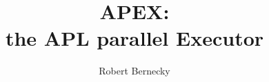 \documentclass[12pt,twoside]{utthesis}
\author{Robert Bernecky}
\title{APEX:\\ the APL parallel Executor}
\begin{document}

\begin{spacing}{\normalspacing} %

\begin{preliminary}

\maketitle

\begin{abstract}
\end{abstract}

\begin{acknowledgements}
\end{acknowledgements}

\tableofcontents\newpage

\end{preliminary}




\end{spacing}
\end{document}
